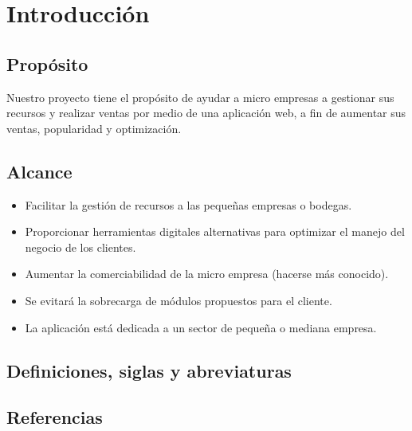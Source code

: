 \chapter{Introducción}

\section{Propósito}

Nuestro proyecto tiene el propósito de ayudar a micro empresas a gestionar sus recursos y realizar ventas por medio de una aplicación web, a fin de aumentar sus ventas, popularidad y optimización.

\section{Alcance}
\begin{itemize}
\item Facilitar la gestión de recursos a las pequeñas empresas o bodegas.
\item Proporcionar herramientas digitales alternativas para optimizar el manejo del negocio de los clientes.
\item Aumentar la comerciabilidad de la micro empresa (hacerse más conocido).
\item Se evitará la sobrecarga de módulos propuestos para el cliente.
\item La aplicación está dedicada a un sector de pequeña o mediana empresa.
\end{itemize}
\section{Definiciones, siglas y abreviaturas}

\section{Referencias}